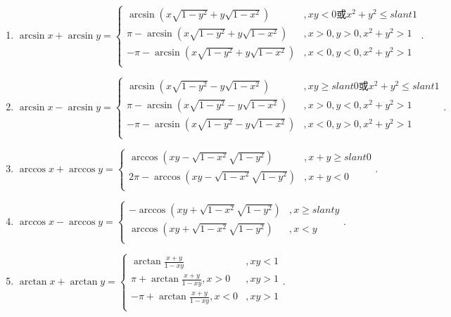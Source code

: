\documentclass[../../main.tex]{subfiles}
\begin{document}
\begin{theorem}[常用反三角函数性质]\label{theorem:常用反三角函数性质}
\begin{enumerate}
\item $\arcsin x+\arcsin y=\begin{cases}
\arcsin \left( x\sqrt{1-y^2}+y\sqrt{1-x^2} \right) &,xy<0\text{或}x^2+y^2\leqslant slant 1\\
\pi -\arcsin \left( x\sqrt{1-y^2}+y\sqrt{1-x^2} \right) &,x>0,y>0,x^2+y^2>1\\
-\pi -\arcsin \left( x\sqrt{1-y^2}+y\sqrt{1-x^2} \right) &,x<0,y<0,x^2+y^2>1\\
\end{cases}.$

\item $\arcsin x-\arcsin y=\begin{cases}
\arcsin \left( x\sqrt{1-y^2}-y\sqrt{1-x^2} \right) &,xy\geqslant slant 0\text{或}x^2+y^2\leqslant slant 1\\
\pi -\arcsin \left( x\sqrt{1-y^2}-y\sqrt{1-x^2} \right) &,x>0,y<0,x^2+y^2>1\\
-\pi -\arcsin \left( x\sqrt{1-y^2}-y\sqrt{1-x^2} \right) &,x<0,y>0,x^2+y^2>1\\
\end{cases}.$

\item $\arccos x+\arccos y=\begin{cases}
\arccos \left( xy-\sqrt{1-x^2}\sqrt{1-y^2} \right) &,x+y\geqslant slant 0\\
2\pi -\arccos \left( xy-\sqrt{1-x^2}\sqrt{1-y^2} \right) &,x+y<0\\
\end{cases}.$

\item $\arccos x-\arccos y=\begin{cases}
-\arccos \left( xy+\sqrt{1-x^2}\sqrt{1-y^2} \right) &,x\geqslant slant y\\
\arccos \left( xy+\sqrt{1-x^2}\sqrt{1-y^2} \right) &,x<y\\
\end{cases}.$

\item $\arctan x+\arctan y=\begin{cases}
\arctan \frac{x+y}{1-xy}&,xy<1\\
\pi +\arctan \frac{x+y}{1-xy},x>0&,xy>1\\
-\pi +\arctan \frac{x+y}{1-xy},x<0&,xy>1\\
\end{cases}.$


\end{enumerate}
\end{theorem}
\end{document}
